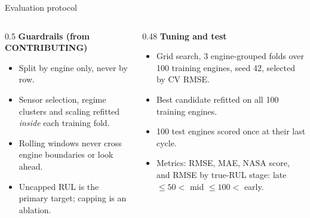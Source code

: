 \documentclass[aspectratio=169,11pt]{beamer}
\begin{document}
\begin{frame}{Evaluation protocol}
  \small
  \begin{columns}[T]
    \begin{column}{0.5\textwidth}
      \textbf{Guardrails (from CONTRIBUTING)}
      \begin{itemize}
        \item Split by engine only, never by row.
        \item Sensor selection, regime clusters and scaling refitted
          \emph{inside} each training fold.
        \item Rolling windows never cross engine boundaries or look ahead.
        \item Uncapped RUL is the primary target; capping is an ablation.
      \end{itemize}
    \end{column}
    \begin{column}{0.48\textwidth}
      \textbf{Tuning and test}
      \begin{itemize}
        \item Grid search, 3 engine-grouped folds over 100 training engines,
          seed 42, selected by CV RMSE.
        \item Best candidate refitted on all 100 training engines.
        \item 100 test engines scored once at their last cycle.
        \item Metrics: RMSE, MAE, NASA score, and RMSE by true-RUL stage:
          late $\le 50 <$ mid $\le 100 <$ early.
      \end{itemize}
    \end{column}
  \end{columns}
\end{frame}
\end{document}
